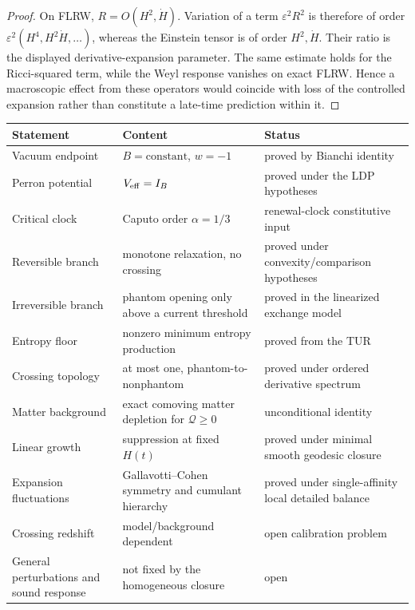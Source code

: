 \documentclass[11pt]{article}
\theoremstyle{definition}
\theoremstyle{remark}
\newcommand{\eps}{\varepsilon}
\begin{document}
\begin{proof}
On FLRW, \(R=O(H^2,\dot H)\).  Variation of a term
\(\eps^2R^2\) is therefore of order
\(\eps^2(H^4,H^2\dot H,\ldots)\), whereas the Einstein tensor is of order
\(H^2,\dot H\).  Their ratio is the displayed derivative-expansion parameter.
The same estimate holds for the Ricci-squared term, while the Weyl response
vanishes on exact FLRW.  Hence a macroscopic effect from these operators would
coincide with loss of the controlled expansion rather than constitute a
late-time prediction within it.
\end{proof}

\begin{center}
\renewcommand{\arraystretch}{1.17}
\begin{tabular}{p{}p{}p{}}
\toprule
\textbf{Statement} & \textbf{Content} & \textbf{Status}\\
\midrule
Vacuum endpoint & \(B=\mathrm{constant}\), \(w=-1\) & proved by Bianchi identity\\
Perron potential & \(V_{\rm eff}=I_B\) & proved under the LDP hypotheses\\
Critical clock & Caputo order \(\alpha=1/3\) & renewal-clock constitutive input\\
Reversible branch & monotone relaxation, no crossing & proved under convexity/comparison hypotheses\\
Irreversible branch & phantom opening only above a current threshold & proved in the linearized exchange model\\
Entropy floor & nonzero minimum entropy production & proved from the TUR\\
Crossing topology & at most one, phantom-to-nonphantom & proved under ordered derivative spectrum\\
Matter background & exact comoving matter depletion for \(\mathcal Q\ge0\) & unconditional identity\\
Linear growth & suppression at fixed \(H(t)\) & proved under minimal smooth geodesic closure\\
Expansion fluctuations & Gallavotti--Cohen symmetry and cumulant hierarchy & proved under single-affinity local detailed balance\\
Crossing redshift & model/background dependent & open calibration problem\\
General perturbations and sound response & not fixed by the homogeneous closure & open\\
\bottomrule
\end{tabular}
\end{center}
\end{document}

